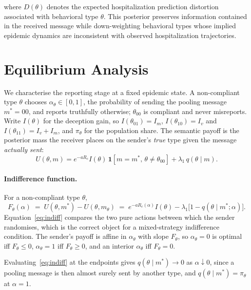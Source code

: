 \documentclass[sigconf,review]{acmart}
\begin{document}
where $D(\theta)$ denotes the expected hospitalization prediction distortion associated with behavioral type $\theta$. This posterior preserves information contained in the received message
while down-weighting behavioral types whose implied epidemic dynamics
are inconsistent with observed hospitalization trajectories.


\section{Equilibrium Analysis}
\label{sec:equilibrium}

We characterise the reporting stage at a fixed epidemic state. A non-compliant type
$\theta$ chooses $\alpha_\theta\in[0,1]$, the probability of sending the pooling message
$m^{*}=00$, and reports truthfully otherwise; $\theta_{00}$ is compliant and never
misreports. Write $I(\theta)$ for the deception gain, so $I(\theta_{01})=I_m$,
$I(\theta_{10})=I_v$ and $I(\theta_{11})=I_v+I_m$, and $\pi_\theta$ for the population
share. The semantic payoff is the posterior mass the receiver places on the sender's
\emph{true} type given the message \emph{actually sent}:
\begin{equation}
U(\theta,m)=e^{-aR_c}I(\theta)\,\mathbf 1[m=m^{*},\,\theta\neq\theta_{00}]
            +\lambda_1\,q(\theta\mid m).
\label{eq:sender-utility}
\end{equation}

\paragraph{Indifference function.}
For a non-compliant type $\theta$,
\begin{equation}
F_\theta(\alpha)\;=\;U(\theta,m^{*})-U(\theta,m_\theta)
\;=\;e^{-aR_c(\alpha)}I(\theta)-\lambda_1\bigl[1-q(\theta\mid m^{*};\alpha)\bigr].
\label{eq:indiff}
\end{equation}
Equation~\eqref{eq:indiff} compares the two pure actions between which the sender
randomises, which is the correct object for a mixed-strategy indifference condition. The
sender's payoff is affine in $\alpha_\theta$ with slope $F_\theta$, so $\alpha_\theta=0$ is
optimal iff $F_\theta\le0$, $\alpha_\theta=1$ iff $F_\theta\ge0$, and an interior
$\alpha_\theta$ iff $F_\theta=0$.

Evaluating~\eqref{eq:indiff} at the endpoints gives $q(\theta\mid m^{*})\to0$ as
$\alpha\downarrow0$, since a pooling message is then almost surely sent by another type,
and $q(\theta\mid m^{*})=\pi_\theta$ at $\alpha=1$.
\end{document}
